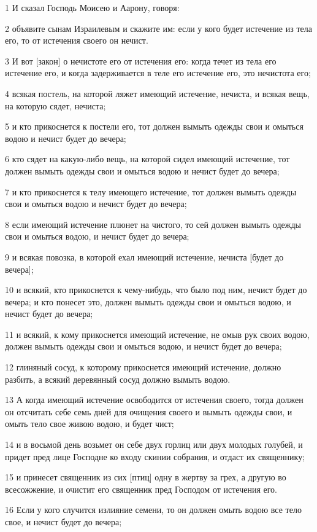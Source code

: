 \par 1 И сказал Господь Моисею и Аарону, говоря:
\par 2 объявите сынам Израилевым и скажите им: если у кого будет истечение из тела его, то от истечения своего он нечист.
\par 3 И вот [закон] о нечистоте его от истечения его: когда течет из тела его истечение его, и когда задерживается в теле его истечение его, это нечистота его;
\par 4 всякая постель, на которой ляжет имеющий истечение, нечиста, и всякая вещь, на которую сядет, нечиста;
\par 5 и кто прикоснется к постели его, тот должен вымыть одежды свои и омыться водою и нечист будет до вечера;
\par 6 кто сядет на какую-либо вещь, на которой сидел имеющий истечение, тот должен вымыть одежды свои и омыться водою и нечист будет до вечера;
\par 7 и кто прикоснется к телу имеющего истечение, тот должен вымыть одежды свои и омыться водою и нечист будет до вечера;
\par 8 если имеющий истечение плюнет на чистого, то сей должен вымыть одежды свои и омыться водою, и нечист будет до вечера;
\par 9 и всякая повозка, в которой ехал имеющий истечение, нечиста [будет до вечера];
\par 10 и всякий, кто прикоснется к чему-нибудь, что было под ним, нечист будет до вечера; и кто понесет это, должен вымыть одежды свои и омыться водою, и нечист будет до вечера;
\par 11 и всякий, к кому прикоснется имеющий истечение, не омыв рук своих водою, должен вымыть одежды свои и омыться водою, и нечист будет до вечера;
\par 12 глиняный сосуд, к которому прикоснется имеющий истечение, должно разбить, а всякий деревянный сосуд должно вымыть водою.
\par 13 А когда имеющий истечение освободится от истечения своего, тогда должен он отсчитать себе семь дней для очищения своего и вымыть одежды свои, и омыть тело свое живою водою, и будет чист;
\par 14 и в восьмой день возьмет он себе двух горлиц или двух молодых голубей, и придет пред лице Господне ко входу скинии собрания, и отдаст их священнику;
\par 15 и принесет священник из сих [птиц] одну в жертву за грех, а другую во всесожжение, и очистит его священник пред Господом от истечения его.
\par 16 Если у кого случится излияние семени, то он должен омыть водою все тело свое, и нечист будет до вечера;
